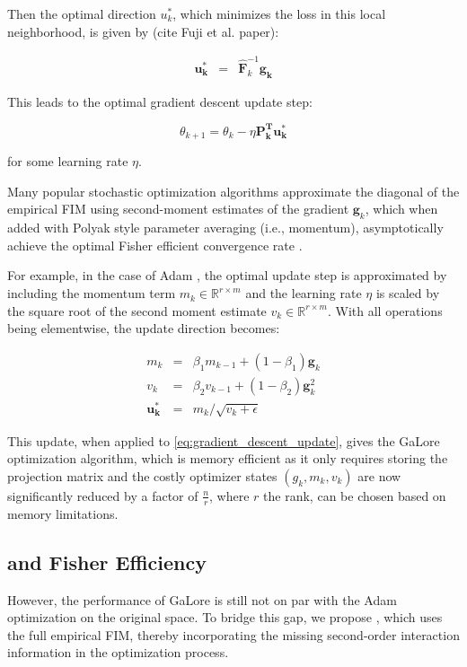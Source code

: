 Then the optimal direction \(u_{k}^{*}\), which minimizes the loss in this local neighborhood, is given by (cite Fuji et al. paper):

\begin{eqnarray}
\mathbf{u_{k}^{*}} &=& \mathbf{\hat{F}}_{k}^{-1} \mathbf{g_{k}}
\label{eq:optimal_direction}
\end{eqnarray}

This leads to the optimal gradient descent update step:

\[
\theta_{k+1} = \theta_{k} - \eta \mathbf{P_{k}^T u^*_{k}}
\label{eq:gradient_descent_update}
\]

for some learning rate \(\eta\).

Many popular stochastic optimization algorithms approximate the diagonal of the empirical FIM using second-moment estimates of the gradient \(\mathbf{g}_{k}\), which when added with Polyak style parameter averaging (i.e., momentum), asymptotically achieve the optimal Fisher efficient convergence rate \citep{martens2020new}.

For example, in the case of Adam \citep{}, the optimal update step is approximated by including the momentum term \(m_{k} \in \mathbb{R}^{r\times m}\) and the learning rate \(\eta\) is scaled by the square root of the second moment estimate \(v_{k} \in \mathbb{R}^{r\times m}\). With all operations being elementwise, the update direction becomes:

\begin{eqnarray}
 m_{k} &=& \beta_{1} m_{k-1} + (1-\beta_{1}) \mathbf{g}_{k} \\
 v_{k} &=& \beta_{2} v_{k-1} + (1-\beta_2) \mathbf{g}^{2}_{k}  \\
 \mathbf{u_{k}^{*}} &=& m_{k} / \sqrt{v_{k} + \epsilon}
    \label{eq:adam_update}
\end{eqnarray}

This update, when applied to \ref{eq:gradient_descent_update}, gives the GaLore optimization algorithm, which is memory efficient as it only requires storing the projection matrix and the costly optimizer states \(\left(g_{k}, m_{k}, v_{k}\right)\) are now significantly reduced by a factor of \(\frac{n}{r}\), where \(r\) the rank, can be chosen based on memory limitations.

\subsection{\lowrank and Fisher Efficiency}

However, the performance of GaLore is still not on par with the Adam optimization on the original space. To bridge this gap, we propose \lowrank, which uses the full empirical FIM, thereby incorporating the missing second-order interaction information in the optimization process.

